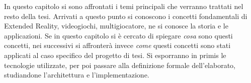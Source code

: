     \newline
    In questo capitolo si sono affrontati i temi principali che verranno trattati nel resto della tesi. Arrivati a questo punto si conoscono i concetti fondamentali di 
    Extended Reality, videogiochi, multigiocatore, ne si conosce la storia e le applicazioni. Se in questo capitolo si è cercato di spiegare \textit{cosa} sono questi concetti, 
    nei successivi si affronterà invece \textit{come} questi concetti sono stati applicati al caso specifico del progetto di tesi. Si esporranno in primis le tecnologie utilizzate, 
    per poi passare alla definizione formale dell'elaborato, studiandone l'architettura e l'implementazione.